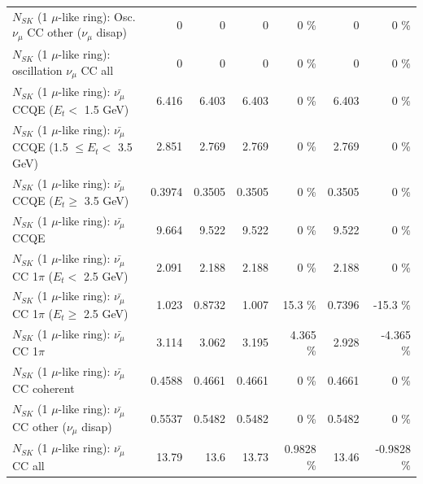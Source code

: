 \begin{table}
\begin{tabular}{| l | r | r | r  r | r  r |}
         $N_{SK}$ (1 $\mu$-like ring): Osc. $\nu_\mu$ CC other ($\nu_\mu$ disap) &               0 &               0 &               0 &        0 \%  &               0 &        0 \%  \\ 
                      $N_{SK}$ (1 $\mu$-like ring): oscillation $\nu_\mu$ CC all &               0 &               0 &               0 &        0 \%  &               0 &        0 \%  \\ 
\hline
\hline
          $N_{SK}$ (1 $\mu$-like ring): $\bar{\nu_\mu}$ CCQE ($E_{t} <$ 1.5 GeV) &           6.416 &           6.403 &           6.403 &        0 \%  &           6.403 &        0 \%  \\ 
 $N_{SK}$ (1 $\mu$-like ring): $\bar{\nu_\mu}$ CCQE (1.5 $\leq E_{t} <$ 3.5 GeV) &           2.851 &           2.769 &           2.769 &        0 \%  &           2.769 &        0 \%  \\ 
       $N_{SK}$ (1 $\mu$-like ring): $\bar{\nu_\mu}$ CCQE ($E_{t} \geq$ 3.5 GeV) &          0.3974 &          0.3505 &          0.3505 &        0 \%  &          0.3505 &        0 \%  \\ 
\hline
                              $N_{SK}$ (1 $\mu$-like ring): $\bar{\nu_\mu}$ CCQE &           9.664 &           9.522 &           9.522 &        0 \%  &           9.522 &        0 \%  \\ 
\hline
     $N_{SK}$ (1 $\mu$-like ring): $\bar{\nu_\mu}$ CC 1$\pi$ ($E_{t} <$ 2.5 GeV) &           2.091 &           2.188 &           2.188 &        0 \%  &           2.188 &        0 \%  \\ 
  $N_{SK}$ (1 $\mu$-like ring): $\bar{\nu_\mu}$ CC 1$\pi$ ($E_{t} \geq$ 2.5 GeV) &           1.023 &          0.8732 &           1.007 &     15.3 \%  &          0.7396 &    -15.3 \%  \\ 
\hline
                         $N_{SK}$ (1 $\mu$-like ring): $\bar{\nu_\mu}$ CC 1$\pi$ &           3.114 &           3.062 &           3.195 &    4.365 \%  &           2.928 &   -4.365 \%  \\ 
                       $N_{SK}$ (1 $\mu$-like ring): $\bar{\nu_\mu}$ CC coherent &          0.4588 &          0.4661 &          0.4661 &        0 \%  &          0.4661 &        0 \%  \\ 
        $N_{SK}$ (1 $\mu$-like ring): $\bar{\nu_\mu}$ CC other ($\nu_\mu$ disap) &          0.5537 &          0.5482 &          0.5482 &        0 \%  &          0.5482 &        0 \%  \\ 
                          $N_{SK}$ (1 $\mu$-like ring): $\bar{\nu_{\mu}}$ CC all &           13.79 &            13.6 &           13.73 &   0.9828 \%  &           13.46 &  -0.9828 \%  \\ 

\end{tabular}
\end{table}
